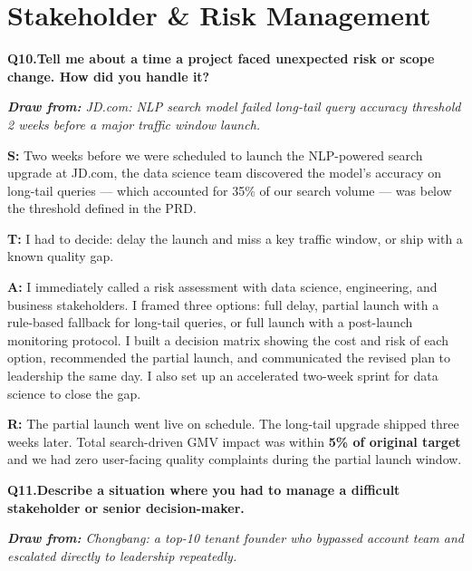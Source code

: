 \documentclass[10pt, letterpaper]{article}
\newcommand{\q}[2]{%
    \smallskip
    \noindent\textbf{\small Q#1.}\quad\textbf{#2}
    \vspace{3pt}
}
\newcommand{\hint}[1]{%
    \begin{notebox}
    \footnotesize\textit{\textbf{Draw from:} #1}
    \end{notebox}
}
\newcommand{\s}[1]{\textbf{\textcolor{starlabel}{S:}} #1}
\newcommand{\ta}[1]{\textbf{\textcolor{starlabel}{T:}} #1}
\newcommand{\ac}[1]{\textbf{\textcolor{starlabel}{A:}} #1}
\newcommand{\res}[1]{\textbf{\textcolor{starlabel}{R:}} #1}
\begin{document}
\section{Stakeholder \& Risk Management}

\q{10}{Tell me about a time a project faced unexpected risk or scope change. How did you handle it?}
\hint{JD.com: NLP search model failed long-tail query accuracy threshold 2 weeks before a major traffic window launch.}

\begin{answerbox}
\footnotesize
\s{Two weeks before we were scheduled to launch the NLP-powered search upgrade at JD.com, the data science team discovered the model's accuracy on long-tail queries --- which accounted for 35\% of our search volume --- was below the threshold defined in the PRD.}

\medskip
\ta{I had to decide: delay the launch and miss a key traffic window, or ship with a known quality gap.}

\medskip
\ac{I immediately called a risk assessment with data science, engineering, and business stakeholders. I framed three options: full delay, partial launch with a rule-based fallback for long-tail queries, or full launch with a post-launch monitoring protocol. I built a decision matrix showing the cost and risk of each option, recommended the partial launch, and communicated the revised plan to leadership the same day. I also set up an accelerated two-week sprint for data science to close the gap.}

\medskip
\res{The partial launch went live on schedule. The long-tail upgrade shipped three weeks later. Total search-driven GMV impact was within \textbf{5\% of original target} and we had zero user-facing quality complaints during the partial launch window.}
\end{answerbox}

\q{11}{Describe a situation where you had to manage a difficult stakeholder or senior decision-maker.}
\hint{Chongbang: a top-10 tenant founder who bypassed account team and escalated directly to leadership repeatedly.}
\end{document}
